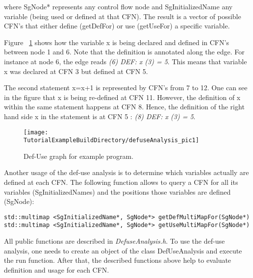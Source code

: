 where SgNode* represents any control flow node and SgInitializedName any variable (being
used or defined at that CFN). The result is a vector of possible CFN's that either
define (getDefFor) or use (getUseFor) a specific variable.

Figure ~\ref{Tutorial:exampledefuse} shows how the variable x is being
declared and defined in CFN's between node 1 and 6. Note that the definition
is annotated along the edge. For instance at node 6, the edge reads 
\emph{(6) DEF: x (3) = 5}. This means that variable x was declared at CFN 3 but
defined at CFN 5.

The second statement x=x+1 is represented by CFN's from 7 to 12.
One can see in the figure that x is being re-defined at CFN 11. However,
the definition of x within the same statement happens at CFN 8. Hence, the 
definition of the right hand side x in the statement is at CFN 5 :
\emph{(8) DEF: x (3) = 5}.

\begin{figure}
\texttt{[image: \\TutorialExampleBuildDirectory/defuseAnalysis\_pic1]}
\caption{Def-Use graph for example program.}
\label{Tutorial:exampledefuse}
\end{figure}

Another usage of the def-use analysis is to determine which variables actually
are defined at each CFN. The following function allows to query a CFN for
all its variables (SgInitializedNames) and the positions those variables are defined
(SgNode):

\begin{verbatim}
std::multimap <SgInitializedName*, SgNode*> getDefMultiMapFor(SgNode*)
std::multimap <SgInitializedName*, SgNode*> getUseMultiMapFor(SgNode*)
\end{verbatim}

All public functions are described in \emph{DefuseAnalysis.h}. To use the def-use 
analysis, one needs to create an object of the class DefUseAnalysis and execute
the run function. After that, the described functions above help to evaluate 
definition and usage for each CFN.




